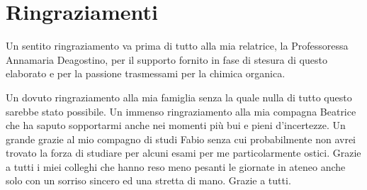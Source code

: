 \documentclass[a4paper, 12pt]{article}
\begin{document}
\newpage

\section{Ringraziamenti}
Un sentito ringraziamento va prima di tutto alla mia relatrice, la Professoressa Annamaria Deagostino, per il supporto fornito in fase di stesura di questo elaborato e per la passione trasmessami per la chimica organica.

Un dovuto ringraziamento alla mia famiglia senza la quale nulla di tutto questo sarebbe stato possibile. Un immenso ringraziamento alla mia compagna Beatrice che ha saputo sopportarmi anche nei momenti più bui e pieni d'incertezze. Un grande grazie al mio compagno di studi Fabio senza cui probabilmente non avrei trovato la forza di studiare per alcuni esami per me particolarmente ostici. Grazie a tutti i miei colleghi che hanno reso meno pesanti le giornate in ateneo anche solo con un sorriso sincero ed una stretta di mano. Grazie a tutti.




\newpage

\printbibliography
\end{document}
